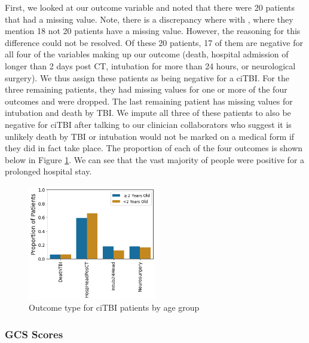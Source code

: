 \documentclass[11pt, letterpaper]{amsart}
\let\Oldsubsubsection\subsubsection
\renewcommand{\subsubsection}{\FloatBarrier\Oldsubsubsection}
\begin{document}
First, we looked at our outcome variable and noted that there were 20 patients that had a missing value. Note, there is a discrepancy where with \cite{kuppermann2009identification}, where they mention 18 not 20 patients have a missing value. However, the reasoning for this difference could not be resolved. Of these 20 patients, 17 of them are negative for all four of the variables making up our outcome (death, hospital admission of longer than 2 days post CT, intubation for more than 24 hours, or neurological surgery). We thus assign these patients as being negative for a ciTBI. For the three remaining patients, they had missing values for one or more of the four outcomes and were dropped. The last remaining patient has missing values for intubation and death by TBI. We impute all three of these patients to also be negative for ciTBI after talking to our clinician collaborators who suggest it is unlikely death by TBI or intubation would not be marked on a medical form if they did in fact take place. The proportion of each of the four outcomes is shown below in Figure \ref{fig:outcome_type}. We can see that the vast majority of people were positive for a prolonged hospital stay.
\begin{figure}
	\centering
	\includegraphics[width=0.5\textwidth]{outcome_type.png}
	\caption{Outcome type for ciTBI patients by age group}\label{fig:outcome_type}
\end{figure}


\subsubsection{GCS Scores}
\end{document}
